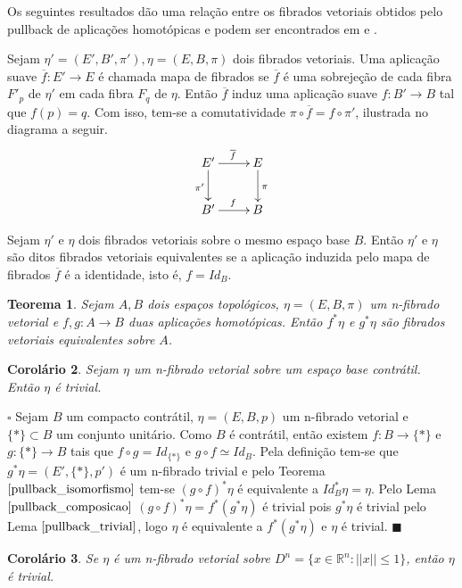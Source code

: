\documentclass[12pt]{book}
\newtheorem{teorema}{Teorema}[section]
\newtheorem{corolario}[teorema]{Corolário}
\newenvironment{prova}[1]{$\square$ #1}{\hfill$\blacksquare$}
\newcommand{\norma}[1]{||#1||}
\newcommand{\real}[1]{\mathbb{R}^{#1}}
\begin{document}
	Os seguintes resultados dão uma relação entre os fibrados vetoriais obtidos pelo pullback de aplicações homotópicas e podem ser encontrados em \cite{nakahara} e \cite{steenrod_fibre_bundles}.
	
	Sejam $ \eta'=(E',B',\pi'), \eta=(E,B,\pi)$ dois fibrados vetoriais.  Uma aplicação suave $\overline{f}:E'\to E$ é chamada mapa de fibrados se $\overline{f}$ é uma sobrejeção de cada fibra $F'_{p}$ de $\eta'$ em cada fibra $F_{q}$ de $\eta$. Então $\overline{f}$ induz uma aplicação suave $f:B'\to B$ tal que $f(p)=q$. Com isso, tem-se a comutatividade $\pi\circ \overline{f} = f\circ\pi'$, ilustrada no diagrama a seguir. 
	$$
	\xymatrix{
		E'\ar[d]_{\pi'}\ar[r]^{\overline{f}} & E\ar[d]^{\pi}
		\\
		B'\ar[r]^{f} & B
	}
	$$
	
	
	Sejam $\eta'$ e $\eta$ dois fibrados vetoriais sobre o mesmo espaço base $B$. Então $\eta'$ e $\eta$ são ditos fibrados vetoriais equivalentes se a aplicação induzida pelo mapa de fibrados $\overline{f}$ é a identidade, isto é, $f=Id_{B}$.
	
	\begin{teorema}\label{pullback_isomorfismo}
		Sejam $A, B$ dois espaços topológicos, $\eta=(E, B, \pi)$ um n-fibrado vetorial e $f,g: A\to B$ duas aplicações homotópicas. Então $f^{*}\eta $ e $g^{*}\eta$ são fibrados vetoriais equivalentes sobre $A$.
	\end{teorema}
	
	\begin{corolario}\label{pullback_contratil}
		Sejam $\eta$ um n-fibrado vetorial sobre um espaço base contrátil. Então $\eta$ é trivial.
	\end{corolario}
	\begin{prova}
		Sejam $B$ um compacto contrátil, $\eta=(E, B, p)$ um n-fibrado vetorial e $\{*\} \subset B$ um conjunto unitário. Como $B$ é contrátil, então existem $f:B\to \{*\}$ e $g:\{*\}\to B$ tais que $f\circ g = Id_{\{*\}}$ e $g\circ f \simeq Id_{B}$. Pela definição tem-se que $g^{*}\eta = (E', \{*\}, p')$ é um n-fibrado trivial e pelo Teorema $\ref{pullback_isomorfismo}$ tem-se $(g\circ f)^{*}\eta $ é equivalente a $ Id_{B}^{*}\eta = \eta$. Pelo Lema $\ref{pullback_composicao}$ $(g\circ f)^{*}\eta = f^{*}(g^{*}\eta) $ é trivial pois $g^{*}\eta$ é trivial pelo Lema $\ref{pullback_trivial}$, logo $ \eta $ é equivalente a $f^{*}(g^{*}\eta)$ e $\eta$ é trivial.
	\end{prova}
	
	\begin{corolario}\label{corolario_fibrado_sobre_Dn}
		Se $\eta$ é um n-fibrado vetorial sobre $D^{n} = \{ x\in \real{n}:\norma{x}\leq 1\}$, então $\eta$ é trivial.
	\end{corolario}
\end{document}

